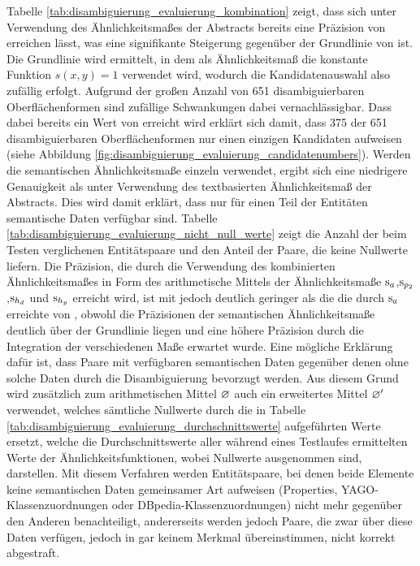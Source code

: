 Tabelle \ref{tab:disambiguierung_evaluierung_kombination} zeigt, dass sich unter Verwendung des Ähnlichkeitsmaßes der Abstracts bereits eine Präzision von  erreichen lässt,
was eine signifikante Steigerung gegenüber der Grundlinie von  ist.
Die Grundlinie wird ermittelt, in dem als Ähnlichkeitsmaß die konstante Funktion $s(x,y) = 1$ verwendet wird, wodurch die Kandidatenauswahl also zufällig erfolgt.
Aufgrund der großen Anzahl von 651 disambiguierbaren Oberflächenformen sind zufällige Schwankungen dabei vernachlässigbar.
Dass dabei bereits ein Wert von  erreicht wird erklärt sich damit, dass 375 der 651 disambiguierbaren Oberflächenformen nur einen einzigen Kandidaten aufweisen (siehe Abbildung \ref{fig:disambiguierung_evaluierung_candidatenumbers}).
Werden die semantischen Ähnlichkeitsmaße einzeln verwendet, ergibt sich eine niedrigere Genauigkeit als unter Verwendung des textbasierten Ähnlichkeitsmaß der Abstracts.
Dies wird damit erklärt, dass nur für einen Teil der Entitäten semantische Daten verfügbar sind.
Tabelle \ref{tab:disambiguierung_evaluierung_nicht_null_werte} zeigt die Anzahl der beim Testen verglichenen Entitätspaare und den Anteil der Paare, die keine Nullwerte liefern.
Die Präzision, die durch die Verwendung des kombinierten Ähnlichkeitsmaßes in Form des arithmetische Mittels der Ähnlichkeitsmaße $\textnormal{s}_{a}$,$\textnormal{s}_{p_2}$,$\textnormal{s}_{h_d}$ und $\textnormal{s}_{h_y}$
erreicht wird, ist mit  jedoch deutlich geringer als die die durch $\textnormal{s}_{a}$ erreichte von , obwohl die Präzisionen der semantischen Ähnlichkeitsmaße deutlich über der Grundlinie liegen und eine
höhere Präzision durch die Integration der verschiedenen Maße erwartet wurde.
Eine mögliche Erklärung dafür ist, dass Paare mit verfügbaren semantischen Daten gegenüber denen ohne solche Daten durch die Disambiguierung bevorzugt werden.
Aus diesem Grund wird zusätzlich zum arithmetischen Mittel $\varnothing$ auch ein erweitertes Mittel $\varnothing'$ verwendet, welches sämtliche Nullwerte durch die in Tabelle \ref{tab:disambiguierung_evaluierung_durchschnittswerte}
aufgeführten Werte ersetzt, welche die Durchschnittswerte aller während eines Testlaufes ermittelten Werte der Ähnlichkeitsfunktionen, wobei Nullwerte ausgenommen sind, darstellen.
Mit diesem Verfahren werden Entitätspaare, bei denen beide Elemente keine semantischen Daten gemeinsamer Art aufweisen (Properties, YAGO-Klassenzuordnungen oder DBpedia-Klassenzuordnungen) nicht mehr gegenüber
den Anderen benachteiligt, andererseits werden jedoch Paare, die zwar über diese Daten verfügen, jedoch in gar keinem Merkmal übereinstimmen, nicht korrekt abgestraft.
